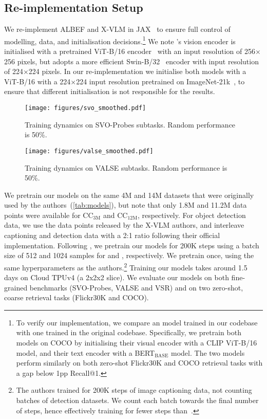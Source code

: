 \subsection{Re-implementation Setup} \label{app:reimplement}
We re-implement ALBEF and X-VLM in JAX~\citep{dm_jax} to ensure full control of modelling, data, and initialisation decisions.\footnote{To verify our implementation, we compare an \albef model trained in our codebase with one trained in the original codebase. Specifically, we pretrain both models on COCO by initialising their visual encoder with a CLIP ViT-B/16 model, and their text encoder with a BERT$_\text{BASE}$ model. The two models perform similarly on both zero-shot Flickr30K and COCO retrieval tasks with a gap below 1pp Recall@1.}
We note \albef's vision encoder is initialised with a pretrained ViT-B/16 encoder~\citep{deit} with an input resolution of 256$\times$256 pixels, but \xvlm adopts a more efficient Swin-B/32~\cite{swin} encoder with input resolution of 224$\times$224 pixels.
In our re-implementation we initialise both models with a ViT-B/16 with a 224$\times$224 input resolution pretrained on ImageNet-21k~\cite{vit_augreg}, to ensure that different initialisation is not responsible for the results.

\begin{figure*}[t!]
    \centering
    \texttt{[image: figures/svo\_smoothed.pdf]}
    \vspace{-7mm}
    \caption{Training dynamics on SVO-Probes subtasks. Random performance is 50\%.}\label{fig:svo_dynamics}
\end{figure*}

\begin{figure*}[t!]
    \centering
    \texttt{[image: figures/valse\_smoothed.pdf]}
    \vspace{-7mm}
    \caption{Training dynamics on VALSE subtasks. Random performance is 50\%.}\label{fig:valse_dynamics}
\end{figure*}

We pretrain our models on the same 4M and 14M datasets that were originally used by the authors~(\cref{tab:models}), but note that only 1.8M and 11.2M data points were available for CC$_\text{3M}$ and CC$_\text{12M}$, respectively.
For object detection data, we use the data points released by the X-VLM authors, and interleave captioning and detection data with a 2:1 ratio following their official implementation.
Following \cite{x-vlm}, we pretrain our models for 200K steps using a batch size of 512 and 1024 samples for \albef and \xvlm, respectively. We pretrain once, using the same hyperparameters as the authors.\footnote{The \xvlm authors trained for 200K steps of image captioning data, not counting batches of detection datasets. We count each batch towards the final number of steps, hence effectively training for fewer steps than~\citet{x-vlm}.}
Training our models takes around 1.5 days on Cloud TPUv4 (a 2x2x2 slice).
We evaluate our models on both fine-grained benchmarks (SVO-Probes, VALSE and VSR) and on two zero-shot, coarse retrieval tasks (Flickr30K and COCO).
